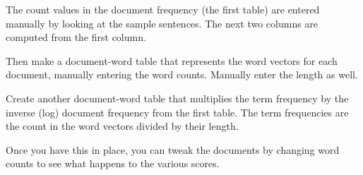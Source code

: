 \documentclass[10pt]{article}
\begin{document}
The count values in the document frequency (the first table) are entered manually by looking at the sample sentences. The next two columns are computed from the first column.

Then make a document-word table that represents the word vectors for each document, manually entering the word counts. Manually enter the length as well.

Create another document-word table that multiplies the term frequency by the inverse (log) document frequency from the first table. The term frequencies are the count in the word vectors divided by their length.

Once you have this in place, you can tweak the documents by changing word counts to see what happens to the various scores.
\end{document}
